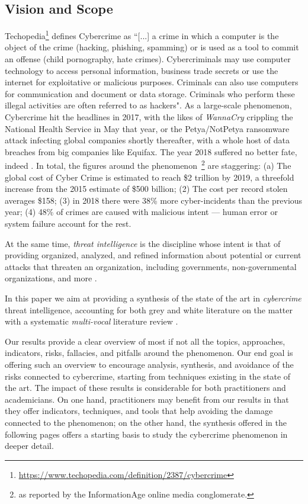 \subsection{Vision and Scope}

Techopedia\footnote{\url{https://www.techopedia.com/definition/2387/cybercrime}} defines Cybercrime as ``[...] a crime in which a computer is the object of the crime (hacking, phishing, spamming) or is used as a tool to commit an offense (child pornography, hate crimes). Cybercriminals may use computer technology to access personal information, business trade secrets or use the internet for exploitative or malicious purposes. Criminals can also use computers for communication and document or data storage. Criminals who perform these illegal activities are often referred to as hackers". As a large-scale phenomenon, Cybercrime hit the headlines in 2017, with the likes of \emph{WannaCry} crippling the National Health Service in May that year, or the Petya/NotPetya ransomware attack infecting global companies shortly thereafter, with a whole host of data breaches from big companies like Equifax. The year 2018 suffered no better fate, indeed \cite{SolanoP17}. In total, the figures around the phenomenon~\footnote{as reported by the InformationAge online media conglomerate.} are staggering: (a) The global cost of Cyber Crime is estimated to reach \$2 trillion by 2019, a threefold increase from the 2015 estimate of \$500 billion; (2) The cost per record stolen averages \$158; (3) in 2018 there were 38\% more cyber-incidents than the previous year; (4) 48\% of crimes are caused with malicious intent --- human error or system failure account for the rest.

At the same time, \emph{threat intelligence} is the discipline whose intent is that of providing organized, analyzed, and refined information about potential or current attacks that threaten an organization, including governments, non-governmental organizations, and more \cite{TounsiR18}.

In this paper we aim at providing a synthesis of the state of the art in \emph{cybercrime} threat intelligence, accounting for both grey and white literature on the matter with a systematic \emph{multi-vocal} literature review \cite{slr,garousi2013evaluating}. 

Our results provide a clear overview of most if not all the topics, approaches, indicators, risks, fallacies, and pitfalls around the phenomenon. Our end goal is offering such an overview to encourage analysis, synthesis, and avoidance of the risks connected to cybercrime, starting from techniques existing in the state of the art. The impact of these results is considerable for both practitioners and academicians. On one hand, practitioners may benefit from our results in that they offer indicators, techniques, and tools that help avoiding the damage connected to the phenomenon; on the other hand, the synthesis offered in the following pages offers a starting basis to study the cybercrime phenomenon in deeper detail.

